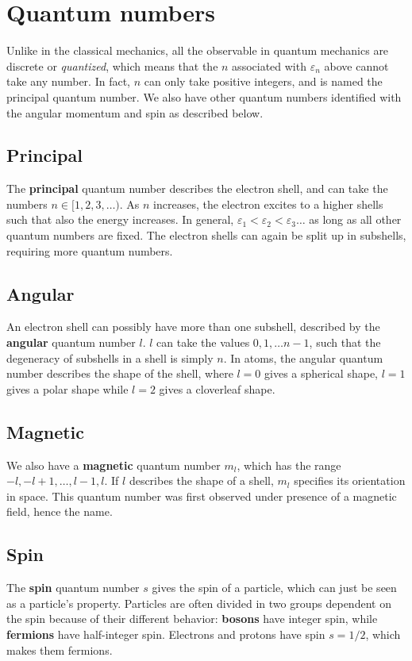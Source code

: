 \section{Quantum numbers}
Unlike in the classical mechanics, all the observable in quantum mechanics are discrete or \textit{quantized}, which means that the $n$ associated with $\varepsilon_n$ above cannot take any number. In fact, $n$ can only take positive integers, and is named the principal quantum number. We also have other quantum numbers identified with the angular momentum and spin as described below.

\subsection*{Principal}
The \textbf{principal} quantum number describes the electron shell, and can take the numbers $n\in[1,2,3,\hdots)$. As $n$ increases, the electron excites to a higher shells such that also the energy increases. In general, $\varepsilon_1<\varepsilon_2<\varepsilon_3\hdots$ as long as all other quantum numbers are fixed. The electron shells can again be split up in subshells, requiring more quantum numbers.

\subsection*{Angular}
An electron shell can possibly have more than one subshell, described by the \textbf{angular} quantum number $l$. $l$ can take the values $0,1,\hdots n-1$, such that the degeneracy of subshells in a shell is simply $n$. In atoms, the angular quantum number describes the shape of the shell, where $l=0$ gives a spherical shape, $l=1$ gives a polar shape while $l=2$ gives a cloverleaf shape. 

\subsection*{Magnetic}
We also have a \textbf{magnetic} quantum number $m_l$, which has the range $-l,-l+1,\hdots,l-1,l$. If $l$ describes the shape of a shell, $m_l$ specifies its orientation in space. This quantum number was first observed under presence of a magnetic field, hence the name.

\subsection*{Spin}
The \textbf{spin} quantum number $s$ gives the spin of a particle, which can just be seen as a particle's property. Particles are often divided in two groups dependent on the spin because of their different behavior: \textbf{bosons} have integer spin, while \textbf{fermions} have half-integer spin. Electrons and protons have spin $s=1/2$, which makes them fermions.

